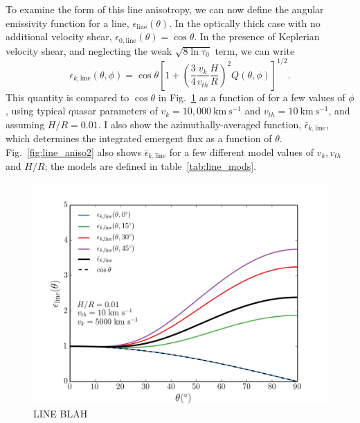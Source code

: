 To examine the form of this line anisotropy, 
we can now define the angular emissivity function for a line, $\epsilon_{\mathrm{line}}(\theta)$.
In the optically thick case with no additional velocity shear, 
$\epsilon_{0,\mathrm{line}}(\theta) = \cos \theta$.
In the presence of Keplerian velocity shear, and neglecting the weak $\sqrt{8 \ln \tau_0}$ term, 
we can write
\begin{equation}
\epsilon_{k, \mathrm{line}}(\theta, \phi) = \cos \theta \left[1 + 
\left(\frac{3}{4}\frac{v_{k}}{v_{th}}\frac{H}{R}\right)^2
Q(\theta, \phi)
\right]^{1/2}.
\end{equation}
This quantity is compared to $\cos \theta$ in Fig.~\ref{fig:line_aniso1} 
as a function of for a few values of $\phi$, 
using typical quasar parameters of $v_k=10,000~\mathrm{km~s^{-1}}$ and 
$v_{th}=10~\mathrm{km~s^{-1}}$, and assuming $H/R=0.01$. I also show the 
azimuthally-averaged function, $\bar{\epsilon}_{k,\mathrm{line}}$, 
which determines the integrated emergent flux as a function of $\theta$.
Fig.~\ref{fig:line_aniso2} also shows $\bar{\epsilon}_{k,\mathrm{line}}$ 
for a few different model values of $v_k, v_{th}$
and $H/R$; the models are defined in table~\ref{tab:line_mods}.

\begin{figure}
\centering
\includegraphics[width=1.0\textwidth]{figures/ewpaper/line_azi.png}
\caption
{
LINE BLAH
}
\label{fig:line_aniso1}
\end{figure}


